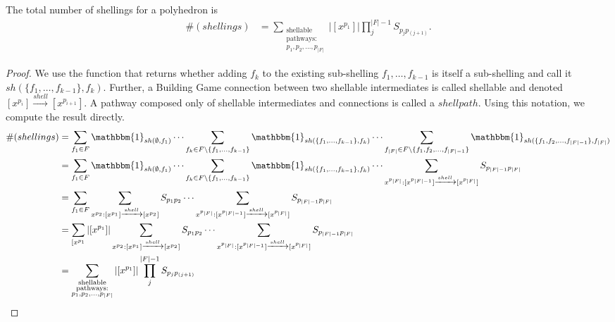 \begin{mythm}
The total number of shellings for a polyhedron is  
\begin{align}
\#(shellings) &= \sum_{\substack{\text{shellable} \\ \text{pathways}: \\ p_1, p_2, \dots, p_{|F|} }}|[x^{p_1}]|\prod_j^{|F|-1}S_{p_jp_{(j+1)}} .
\end{align}
\end{mythm}
\begin{proof}
We use the function that returns whether adding $f_k$ to the existing sub-shelling $f_1,\dots,f_{k-1}$ is itself a sub-shelling and call it $sh(\{f_1,\dots,f_{k-1}\}, f_k)$. Further, a Building Game connection between two shellable intermediates is called shellable and denoted  $[x^{p_i}] \xrightarrow{shell} [x^{p_{i+1}}]$. A pathway composed only of shellable intermediates and connections is called a $shellpath$. Using this notation, we compute the result directly.
\begin{align*}
\#(shellings) &= \sum_{f_1 \in F} \mathbbm{1}_{sh(\emptyset,f_1)} \cdots\sum_{f_k \in F\setminus \{f_1,\dots,f_{k-1}\}} \mathbbm{1}_{sh(\{f_1,\dots,f_{k-1}\}, f_k)}\cdots \sum_{f_{|F|} \in F\setminus \{f_1, f_2, \dots, f_{|F|-1}\}}\mathbbm{1}_{sh(\{f_1, f_2, \dots, f_{|F|-1}\},f_{|F|})}  \\
&= \sum_{f_1 \in F} \mathbbm{1}_{sh(\emptyset,f_1)} \cdots\sum_{f_k \in F\setminus \{f_1,\dots,f_{k-1}\}} \mathbbm{1}_{sh(\{f_1,\dots,f_{k-1}\}, f_k)}\cdots \sum_{x^{p_{|F|}}: [x^{p_{|F|-1}}] \xrightarrow{shell} [x^{p_{|F|}}]} S_{p_{|F|-1}p_{|F|}}  \\
&= \sum_{f_1 \in F} \sum_{x^{p_2}: [x^{p_1}] \xrightarrow{shell} [x^{p_2}]} S_{p_{1}p_{2}}  \cdots \sum_{x^{p_{|F|}}: [x^{p_{|F|-1}}] \xrightarrow{shell} [x^{p_{|F|}}]} S_{p_{|F|-1}p_{|F|}}  \\
&= \sum_{[x^{p_1}} |[x^{p_1}]| \sum_{x^{p_2}: [x^{p_1}] \xrightarrow{shell} [x^{p_2}]} S_{p_{1}p_{2}}  \cdots \sum_{x^{p_{|F|}}: [x^{p_{|F|-1}}] \xrightarrow{shell} [x^{p_{|F|}}]} S_{p_{|F|-1}p_{|F|}}  \\
&= \sum_{\substack{\text{shellable} \\ \text{pathways}: \\ p_1, p_2, \dots, p_{|F|} }}|[x^{p_1}]|\prod_j^{|F|-1}S_{p_jp_{(j+1)}} 
\end{align*}
\end{proof}


